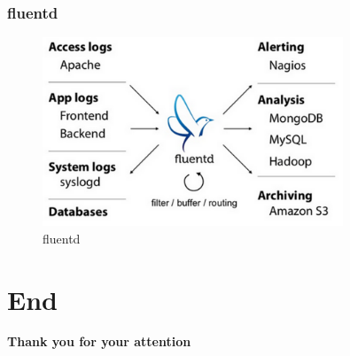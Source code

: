       \begin{frame}
				\frametitle{fluentd}
        \begin{figure}[htb]
    			\begin{center}
  					\includegraphics[width=0.8\textwidth]{img/fluentd-architecture.png}
  					  \caption{fluentd \cite{fluentd-architecture}}
  				\end{center}
  			\end{figure}
			\end{frame}
      
\section*{End}
		\begin{frame}
			\begin{center}
				\vspace*{1cm}
				{\bf Thank you for your attention}\\
				\vspace*{2cm}
				{\bf\Large \FirstName{} \LastName{}}\\
				{\tt \Email}
				\vspace*{1cm}
			\end{center}
			\vfill
		\end{frame}      